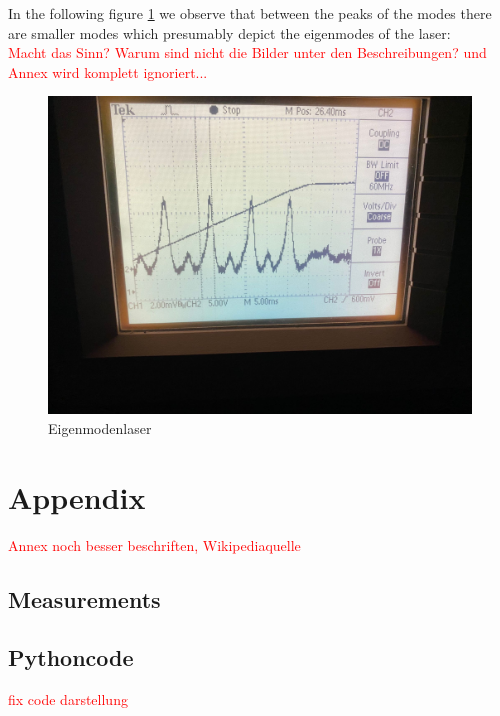 \documentclass{article}
\begin{document}
In the following figure \ref{Eigenmoden_laser} we observe that between the peaks of the modes there are smaller modes which presumably depict the eigenmodes of the laser:\\
\textcolor{red}{Macht das Sinn? Warum sind nicht die Bilder unter den Beschreibungen? und Annex wird komplett ignoriert...}
\begin{figure}[h!]
\includegraphics[width=\textwidth]{oszilloskopbild_mit_eigenmoden_vom_laser.jpg}
\caption{Eigenmodenlaser}
\label{Eigenmoden_laser}
\end{figure}

\section{Appendix}

\textcolor{red}{Annex noch besser beschriften, Wikipediaquelle}

\subsection{Measurements}




\subsection{Pythoncode}

\textcolor{red}{fix code darstellung}
\end{document}
